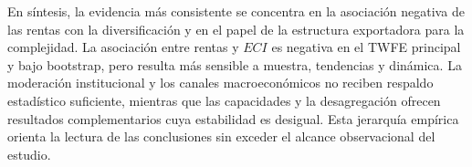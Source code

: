 \documentclass[../../TFM.tex]{subfiles}
\begin{document}
En síntesis, la evidencia más consistente se concentra en la asociación negativa
de las rentas con la diversificación y en el papel de la estructura exportadora
para la complejidad. La asociación entre rentas y $ECI$ es negativa en el TWFE
principal y bajo bootstrap, pero resulta más sensible a muestra, tendencias y
dinámica. La moderación institucional y los canales macroeconómicos no reciben
respaldo estadístico suficiente, mientras que las capacidades y la desagregación
ofrecen resultados complementarios cuya estabilidad es desigual. Esta jerarquía
empírica orienta la lectura de las conclusiones sin exceder el alcance
observacional del estudio.

\end{document}
